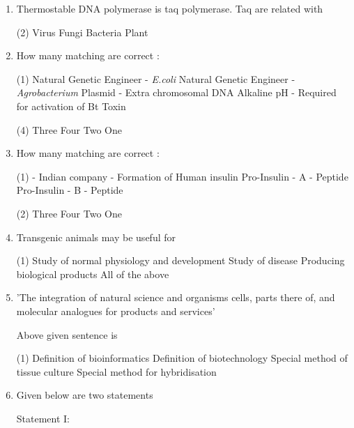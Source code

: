 \documentclass[twocolumn]{article}
\begin{document}
\begin{enumerate}
    \item Thermostable DNA polymerase is taq polymerase. Taq are related with
    \begin{tasks}(2)
        \task Virus
        \task Fungi
        \task Bacteria
        \task Plant
    \end{tasks}
    \item How many matching are correct :
    \begin{tasks}(1)
        \task Natural Genetic Engineer - \textit{E.coli}
        \task Natural Genetic Engineer - \textit{Agrobacterium}
        \task Plasmid - Extra chromosomal DNA
        \task Alkaline pH - Required for activation of Bt Toxin
    \end{tasks}
    \begin{tasks}(4)
        \task Three
        \task Four
        \task Two
        \task One
    \end{tasks}
    \item How many matching are correct :
    \begin{tasks}(1)
        \task {} - Indian company
        \task {} - Formation of Human insulin
        \task Pro-Insulin - A - Peptide
        \task Pro-Insulin - B - Peptide
    \end{tasks}
    \begin{tasks}(2)
        \task Three
        \task Four
        \task Two
        \task One
    \end{tasks}
    \item Transgenic animals may be useful for
    \begin{tasks}(1)
        \task Study of normal physiology and development
        \task Study of disease
        \task Producing biological products
        \task All of the above
    \end{tasks}
    \item 'The integration of natural science and organisms cells, parts there of, and molecular analogues for products and services'
    
    Above given sentence is
    \begin{tasks}(1)
        \task Definition of bioinformatics
        \task Definition of biotechnology
        \task Special method of tissue culture
        \task Special method for hybridisation
    \end{tasks}
    \item Given below are two statements
    
    Statement I:
    

\end{enumerate}
\end{document}

